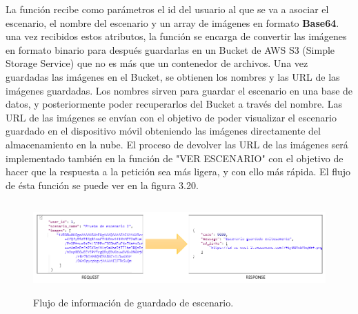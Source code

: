 La función recibe como parámetros el id del usuario al que se va a asociar el escenario, el nombre del escenario y un array de imágenes en formato \textbf{Base64}. una vez recibidos estos atributos, la función se encarga de convertir las imágenes en formato binario para después guardarlas en un Bucket de AWS S3 (Simple Storage Service) que no es más que un contenedor de archivos. Una vez guardadas las imágenes en el Bucket, se obtienen los nombres y las URL de las imágenes guardadas. Los nombres sirven para guardar el escenario en una base de datos, y posteriormente poder recuperarlos del Bucket a través del nombre. Las URL de las imágenes se envían con el objetivo de poder visualizar el escenario guardado en el dispositivo móvil obteniendo las imágenes directamente del almacenamiento en la nube. El proceso de devolver las URL de las imágenes será implementado también en la función de "VER ESCENARIO" con el objetivo de hacer que la respuesta a la petición sea más ligera, y con ello más rápida. El flujo de ésta función se puede ver en la figura 3.20.

\begin{figure}[H]
	\centering
	\includegraphics[width=15cm,height=3.5cm]{imagenes/desarrollo/arquitectura/STORESC_SUCCESS.png}
	\caption{Flujo de información de guardado de escenario.}
	\label{fig:regsuccess}
\end{figure}